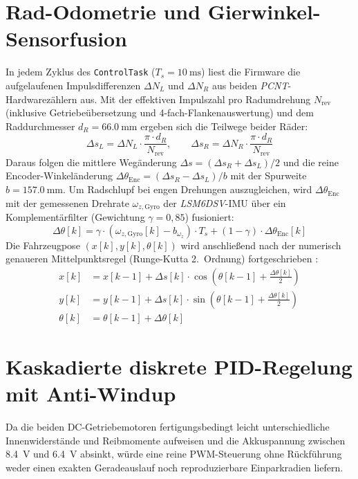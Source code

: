 \section{Rad-Odometrie und Gierwinkel-Sensorfusion}
\label{sec:odometrie}
In jedem Zyklus des \texttt{ControlTask} ($T_s = \qty{10}{\milli\second}$) liest die Firmware die aufgelaufenen Impulsdifferenzen $\Delta N_L$ und $\Delta N_R$ aus beiden \emph{PCNT}-Hardwarezählern aus. Mit der effektiven Impulszahl pro Radumdrehung $N_{\mathrm{rev}}$ (inklusive Getriebeübersetzung und 4-fach-Flankenauswertung) und dem Raddurchmesser $d_R = \qty{66,0}{\milli\meter}$ ergeben sich die Teilwege beider Räder:
\begin{equation}
  \Delta s_L = \Delta N_L \cdot \frac{\pi \cdot d_R}{N_{\mathrm{rev}}}, \qquad
  \Delta s_R = \Delta N_R \cdot \frac{\pi \cdot d_R}{N_{\mathrm{rev}}}
  \label{eq:radwege}
\end{equation}
Daraus folgen die mittlere Wegänderung $\Delta s = (\Delta s_R + \Delta s_L)/2$ und die reine Encoder-Winkeländerung $\Delta \theta_{\mathrm{Enc}} = (\Delta s_R - \Delta s_L)/b$ mit der Spurweite $b = \qty{157,0}{\milli\meter}$. Um Radschlupf bei engen Drehungen auszugleichen, wird $\Delta \theta_{\mathrm{Enc}}$ mit der gemessenen Drehrate $\omega_{z,\mathrm{Gyro}}$ der \emph{LSM6DSV}-IMU über ein Komplementärfilter (Gewichtung $\gamma = 0{,}85$) fusioniert:
\begin{equation}
  \Delta \theta[k] = \gamma \cdot (\omega_{z,\mathrm{Gyro}}[k] - b_{\omega_z}) \cdot T_s + (1 - \gamma) \cdot \Delta \theta_{\mathrm{Enc}}[k]
  \label{eq:komplementaer}
\end{equation}
Die Fahrzeugpose $(x[k], y[k], \theta[k])$ wird anschließend nach der numerisch genaueren Mittelpunktsregel (Runge-Kutta 2.~Ordnung) fortgeschrieben \cite{SiegwartRobotik}:
\begin{align}
  x[k] &= x[k-1] + \Delta s[k] \cdot \cos\!\left(\theta[k-1] + \frac{\Delta \theta[k]}{2}\right) \label{eq:odo_x} \\
  y[k] &= y[k-1] + \Delta s[k] \cdot \sin\!\left(\theta[k-1] + \frac{\Delta \theta[k]}{2}\right) \label{eq:odo_y} \\
  \theta[k] &= \theta[k-1] + \Delta \theta[k] \label{eq:odo_theta}
\end{align}

\section{Kaskadierte diskrete PID-Regelung mit Anti-Windup}
\label{sec:pid_regelung}
Da die beiden DC-Getriebemotoren fertigungsbedingt leicht unterschiedliche Innenwiderstände und Reibmomente aufweisen und die Akkuspannung zwischen \qty{8,4}{\volt} und \qty{6,4}{\volt} absinkt, würde eine reine PWM-Steuerung ohne Rückführung weder einen exakten Geradeauslauf noch reproduzierbare Einparkradien liefern.

